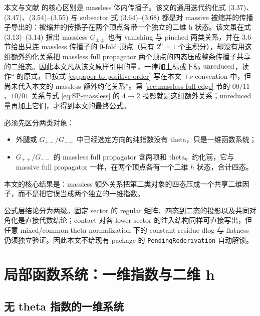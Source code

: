 \documentclass[11pt,a4paper]{ctexart}
\begin{document}
本文与文献 \cite{Chen:2023eic} 的核心区别是 massless 体内传播子。该文的通用迭代约化式 (3.37)、(3.47)、(3.54)--(3.55) 与 subsector 式 (3.64)--(3.68) 都是对 massive 被缩并的传播子导出的：被缩并的传播子在两个顶点各带一个独立的二维 h 状态。该文虽在式 (3.13)--(3.14) 指出 massless $G_{\pm\pm}$ 也有 vanishing 与 pinched 两类关系，并在 3.6 节给出只连 massless 传播子的 0-fold 顶点（只有 $2^0=1$ 个主积分），却没有用这组额外约化关系把 massless full propagator 两个顶点的四态压成整条传播子共享的二维态。因此本文凡从该文原样引用的量，一律加上标或下标 ${\rm unreduced}$，读作“\cite{Chen:2023eic} 的原式，已按式 \eqref{eq:paper-to-positive-order} 写在本文 $+\nu$ convention 中，但尚未代入本文的 massless 额外约化关系”。第 \ref{sec:massless-full-edge} 节的 $00/11$、$10/01$ 关系与式 \eqref{eq:SP-massless} 的 $4\to2$ 投影就是这组额外关系；unreduced 量再加上它们，才得到本文的最终公式。

必须先区分两类对象：
\begin{itemize}
  \item 外腿或 $G_{+-}/G_{-+}$ 中已经选定方向的纯指数没有 theta，只是一维函数系统；
  \item $G_{++}/G_{--}$ 的 massless full propagator 含两项和 theta。约化前，它与 massive full propagator 一样，在两个顶点各有一个二维 $h$ 状态，合计四态。
\end{itemize}
本文的核心结果是：massless 额外关系把第二类对象的四态压成一个共享二维因子，而不是把它误当成两个独立的一维指数。

公式层结论分为两级。固定 sector 的 regular 矩阵、四态到二态的投影以及共同对角化是直接代数结论；contact 对各 lower sector 的注入结构同样可直接写出，但任意 mixed/common-theta normalization 下的 constant-residue dlog 与 flatness 仍须独立验证。因此本文不给现有 package 的 \texttt{PendingRederivation} 自动解锁。

\section{局部函数系统：一维指数与二维 h}
\label{sec:local-function-system}

\subsection{无 theta 指数的一维系统}
\end{document}
